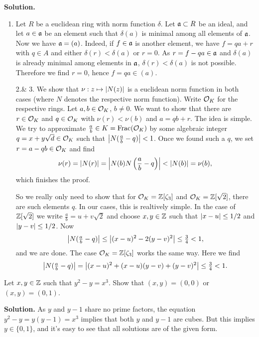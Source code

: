 \documentclass[a4paper,11pt]{article}
\begin{document}
\textbf{Solution.}
\begin{enumerate}
    \item Let $R$ be a euclidean ring with norm function $\delta$. Let $\mathfrak{a}
        \subset R$ be an ideal, and let $a \in \mathfrak{a}$ be an element such that 
        $\delta(a)$ is minimal among all elements of $\mathfrak{a}$. Now we have 
        $\mathfrak{a} = (a)$. Indeed, if $f \in \mathfrak{a}$ is another element, we have 
        $f = qa + r$ with $q \in A$ and either $\delta(r) < \delta(a)$ or 
        $r = 0$. As $r = f - qa \in \mathfrak{a}$ and $\delta(a)$ is already minimal
        among elements in $\mathfrak{a}$, $\delta(r) < \delta(a)$ is not possible.
        Therefore we find $r = 0$, hence $f = qa \in (a)$. 

    \item[2.\& 3.] We show that $\nu: z \mapsto \left\lvert N(z) \right\rvert$ is a euclidean norm
        function in both cases (where $N$ denotes the respective norm function).
        Write $\mathcal{O}_K$ for the respective rings. Let $a,
        b \in \mathcal{O}_K$, $b \neq 0$. We want to show that there 
        are $r \in \mathcal{O}_K$ and $q \in \mathcal{O}_K$ with $\nu(r) < \nu(b)$
        and $a = qb + r$.
        The idea is simple. We try to approximate $\frac ab \in K = \mathrm{Frac}(\mathcal{O}_K)$ by
        some algebraic integer
        $q = x + y\sqrt d \in \mathcal{O}_K$ such that $\left\lvert N(\frac ab - q) \right\rvert < 1$. Once we
        found such a $q$, we set $r = a - qb \in \mathcal{O}_K$ and find
        \begin{equation*}
            \nu(r) = \left\lvert N(r) \right\rvert = \left\lvert N(b)N\left(\frac ab -q \right) \right\rvert
            < \left\lvert N(b) \right\rvert = \nu(b),
        \end{equation*}
        which finishes the proof. 

        So we really only need to show that for $\mathcal{O}_K = \mathbb{Z}[\zeta_3]$ and 
        $\mathcal{O}_K = \mathbb{Z}[\sqrt{2}]$, there are such elements $q$. In our cases,
        this is realtively simple. In the case of $\mathbb{Z}[\sqrt 2]$ we write
        $\frac ab = u + v \sqrt 2 $ and choose $x, y \in
        \mathbb{Z}$ such that 
        $\left\lvert x-u \right\rvert \leq 1/2$ and $\left\lvert y-v \right\rvert \leq 1/2$. Now 
        $$\left\lvert N(\tfrac ab - q) \right\rvert \leq \left\lvert (x-u)^2 - 2(y-v)^2 \right\rvert \leq \tfrac 34 < 1,$$ 
        and we are done. The case $\mathcal{O}_K = \mathbb{Z}[\zeta_3]$ works the same way.
        Here we find 
        $$\left\lvert N(\tfrac ab - q) \right\rvert = \left\lvert (x-u)^2 + (x-u)(y-v) + (y-v)^2 \right\rvert \leq \tfrac
        34 < 1.$$


        
\end{enumerate}


Let $x,y \in \mathbb{Z}$ such that $y^2 -y  = x^3$. Show that $(x,y) = (0,0)$ or 
$(x,y) = (0,1)$. 

\textbf{Solution.} 
As $y$ and $y-1$ share no prime factors, the equation $y^2 - y = y(y-1) = x^3$
implies that both $y$ and $y-1$ are cubes. But this implies $y \in \{0, 1\}$,
and it's easy to see that all solutions are of the given form.

\contactend
\end{document}

